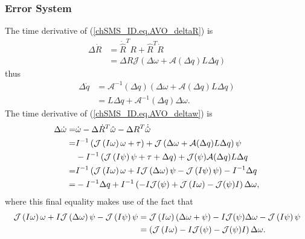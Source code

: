 \subsubsection{Error System}

The time derivative of (\ref{chSMS_ID.eq.AVO_deltaR}) is
%
\begin{align}\label{chSMS_ID.eq.AVO_deltaRdot}
\Delta \dot{R}&=\dot{\hat{R}}^T R + \hat{R}^T \dot{R} \nonumber \\
&= \Delta R \mathcal{J}\left(\Delta \omega +
   \mathcal{A}(\Delta q) L \Delta q\right)
\end{align}
%
thus
%
\begin{align}\label{chSMS_ID.eq.AVO_deltaqdot}
\Delta \dot{q}
 &=\mathcal{A}^{-1}(\Delta q)\left(\Delta \omega +
   \mathcal{A}(\Delta q) L \Delta q\right)          \nonumber \\
 &=L\Delta q+\mathcal{A}^{-1}(\Delta q)\Delta\omega.
\end{align}
%
The time derivative of (\ref{chSMS_ID.eq.AVO_deltaw}) is
%
\begin{align}\label{chSMS_ID.eq.AVO_deltawdot}
\Delta\dot{\omega}
  =&\dot{\omega}-\Delta\dot{R}^T\hat{\omega}-\Delta
    R^T\dot{\hat{\omega}}
                                                        \nonumber  \\
  =&I^{-1}\left(\mathcal{J}\left(I\omega\right)\omega + \tau\right)+\mathcal{J}\left(\Delta \omega 
    +\mathcal{A}(\Delta q)L\Delta q\right)\psi
                                                        \nonumber  \\
   &-I^{-1}\left(\mathcal{J}\left(I \psi\right)\psi+\tau+\Delta q\right)+
    \mathcal{J}(\psi)\mathcal{A}(\Delta q) L\Delta q
                                                        \nonumber  \\
  =&I^{-1}\left(\mathcal{J}\left(I \omega\right) \omega + 
    I \mathcal{J}\left(\Delta \omega\right)\psi -\mathcal{J}\left(I\psi\right)
    \psi \right)-I^{-1} \Delta q                         \nonumber  \\
  =&-I^{-1} \Delta q + I^{-1}\left(-I\mathcal{J}(\psi)
    +\mathcal{J}\left(I \omega\right)-\mathcal{J}(\psi)I
    \right)\Delta\omega,
\end{align} 
%
where this final equality makes use of the fact that
%
\begin{align*}
\mathcal{J}\left(I\omega\right)\omega +I\mathcal{J}\left(\Delta \omega\right)\psi
-\mathcal{J}\left(I\psi\right)\psi&=\mathcal{J}\left(I\omega\right)\left(\Delta \omega +\psi\right)
-I\mathcal{J}(\psi)\Delta \omega -\mathcal{J}\left(I \psi\right)\psi    \nonumber   \\
   &= \left(\mathcal{J}\left(I\omega\right)-I\mathcal{J}(\psi)
      - \mathcal{J}(\psi)I\right)\Delta \omega.
\end{align*}
